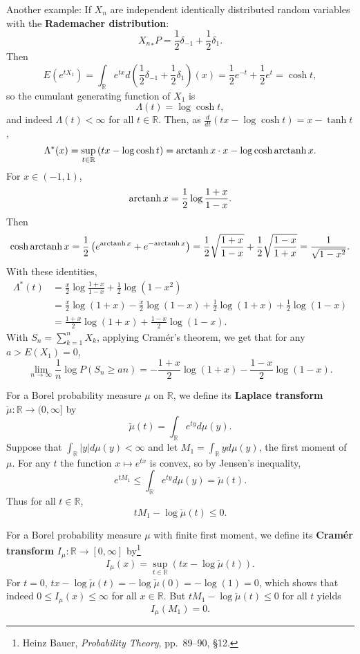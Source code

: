 \documentclass{article}
\newcommand{\arctanh}{\ensuremath\mathrm{arctanh}\,}
\theoremstyle{definition}
\begin{document}
Another example: If $X_n$ are independent identically distributed random
variables with the \textbf{Rademacher distribution}:
\[
{X_n}_*P = \frac{1}{2} \delta_{-1}+\frac{1}{2}\delta_1. 
\]
Then 
\[
E(e^{tX_1}) = \int_\mathbb{R} e^{tx} d\left(\frac{1}{2}\delta_{-1}+\frac{1}{2}\delta_1\right)(x)
=\frac{1}{2}e^{-t}+\frac{1}{2}e^t
=\cosh t,
\]
so the cumulant generating function of $X_1$ is
\[
\Lambda(t) = \log \cosh t,
\]
and indeed $\Lambda(t)<\infty$ for all $t \in \mathbb{R}$. 
Then, as $\frac{d}{dt}(tx-\log \cosh t) = x - \tanh t$,
\[
\Lambda^*(x) = \sup_{t \in \mathbb{R}} \left(tx - \log \cosh t\right)
=\arctanh x \cdot x- \log \cosh \arctanh x.
\]
For $x \in (-1,1)$, 
\[
\arctanh x = \frac{1}{2} \log \frac{1+x}{1-x}.
\]
Then
\[
\cosh \arctanh x = \frac{1}{2}\left(e^{\arctanh x} + e^{-\arctanh x}\right)
=\frac{1}{2} \sqrt{\frac{1+x}{1-x}} + \frac{1}{2} \sqrt{\frac{1-x}{1+x}} 
=\frac{1}{\sqrt{1-x^2}}.
\]
With these identities,
\begin{align*}
\Lambda^*(t)& = \frac{x}{2} \log \frac{1+x}{1-x} + \frac{1}{2} \log(1-x^2)\\
&=\frac{x}{2} \log (1+x) - \frac{x}{2} \log(1-x) + \frac{1}{2} \log(1+x) + \frac{1}{2} \log(1-x)\\
&=\frac{1+x}{2} \log(1+x) + \frac{1-x}{2} \log(1-x).
\end{align*}
With $S_n=\sum_{k=1}^n X_k$,
applying Cram\'er's theorem, we get that for 
any $a>E(X_1)=0$, 
\[
\lim_{n \to \infty} \frac{1}{n} \log P(S_n \geq an) = -\frac{1+x}{2} \log(1+x) - \frac{1-x}{2} \log(1-x).
\]

For a Borel probability measure $\mu$ on $\mathbb{R}$,
we define its \textbf{Laplace transform} $\check{\mu}:\mathbb{R} \to (0,\infty]$ by
\[
\check{\mu}(t) = \int_\mathbb{R} e^{ty} d\mu(y).
\]
Suppose that $\int_\mathbb{R} |y| d\mu(y)<\infty$ and let
 $M_1 = \int_\mathbb{R} y d\mu(y)$, the first moment of $\mu$.
For any $t$ the function $x \mapsto e^{tx}$ is convex, so by  Jensen's inequality,
\[
e^{tM_1} \leq \int_\mathbb{R} e^{ty} d\mu(y) = \check{\mu}(t).
\]
Thus for all $t \in \mathbb{R}$,
\[
t M_1 - \log \check{\mu}(t) \leq 0.
\]

For a Borel probability measure $\mu$ with finite first moment, we define
 its \textbf{Cram\'er transform}
$I_\mu:\mathbb{R} \to [0,\infty]$ by\footnote{Heinz Bauer, {\em Probability Theory},
pp.~89--90,  \S 12.}
\[
I_\mu(x) = \sup_{t \in \mathbb{R}} (tx - \log \check{\mu}(t)).
\]
For $t=0$, $tx-\log \check{\mu}(t)=-\log \check{\mu}(0)=-\log(1)=0$, which shows that
indeed $0 \leq I_\mu(x) \leq \infty$ for all $x \in \mathbb{R}$. 
But $tM_1 - \log \check{\mu}(t) \leq 0$ for all $t$ yields 
\[
I_\mu(M_1)  = 0.
\]
\end{document}
